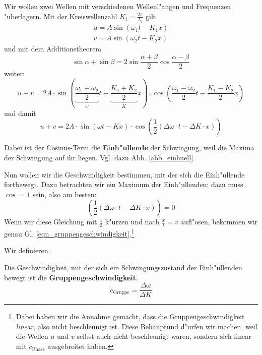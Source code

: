 Wir wollen zwei Wellen mit verschiedenen Wellenl"angen und Frequenzen
"uberlagern. Mit der Kreiswellenzahl $K_i = \frac{2\pi}{\lambda_i}$ 
gilt
\begin{eqnarray}
   \label{eq:164}
   u = A \sin (\omega_1 t - K_1 x)\\
   v = A \sin(\omega_2 t - K_2 x)
\end{eqnarray}
und mit  dem
Additionstheorem
$$
\sin \alpha + \sin \beta = 2 \sin \frac{\alpha + \beta}{2} \cos
\frac{\alpha - \beta}{2}
$$
weiter:
\begin{equation}
   \label{eq:165}
\boxed{ u + v = 
 2 A \cdot \sin \left ( \underbrace{\frac{\omega_1 + \omega_2}{2}}_\omega t - \underbrace{ \frac{K_1 +
     K_2}{2}}_K x \right ) \cdot \cos \left ( \frac{\omega_1 -
     \omega_2}{2}t - \frac{K_1  - K_2}{2}x \right )
}
\end{equation}
und damit
\begin{equation}
   \label{eq:166}
   u+v = 2A \cdot \sin (\omega t - K x) \cdot \cos \left ( \frac{1}{2} (\Delta \omega \cdot t -
   \Delta K \cdot x ) \right )
\end{equation}

Dabei ist der Cosinus-Term die \textbf{Einh"ullende} der Schwingung,
weil die Maxima der Schwingung auf ihr liegen. Vgl. dazu
Abb. \ref{abb_einhuell}.

Nun wollen wir die Geschwindigkeit bestimmen, mit der sich die
Einh"ullende fortbewegt. Dazu betrachten wir ein Maximum der
Einh"ullenden; dazu muss $\cos = 1$ sein, also am besten:
\begin{equation}
   \label{eq:168}
   \left ( \frac{1}{2} (\Delta \omega \cdot t -
   \Delta K \cdot x ) \right ) = 0
\end{equation}
Wenn wir diese Gleichung mit $\frac{1}{2}$ k"urzen und nach
$\frac{x}{t} = v$ aufl"osen, bekommen wir genau
Gl. \eqref{eqn_gruppengeschwindigkeit}.\footnote{Dabei haben wir die
  Annahme gemacht, dass die Gruppengeschwindigkeit \emph{linear}, also
nicht beschleunigt ist. Diese Behauptund d"urfen wir machen, weil die
Wellen $u$ und $v$ selbst auch nicht beschleunigt waren, sondern sich
linear mit $c_\text{Phase}$ ausgebreitet haben.}


Wir definieren:
\begin{Def}
   Die Geschwindigkeit, mit der sich ein Schwingungszustand der
   Einh"ullenden bewegt ist die
   \textbf{Gruppengeschwindigkeit}.
   \begin{equation}
      \label{eqn_gruppengeschwindigkeit}
      c_\text{Gruppe} = \frac{\Delta \omega}{\Delta K}
   \end{equation}
\end{Def}


